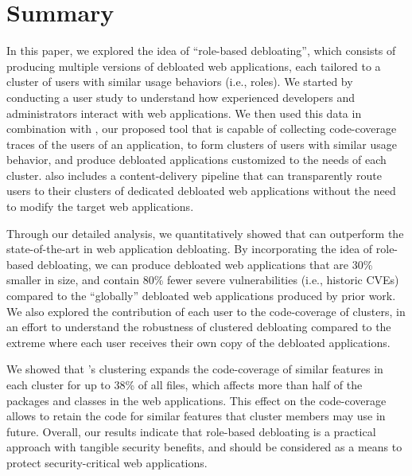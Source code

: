 \section{Summary}

In this paper, we explored the idea of ``role-based debloating'', which consists of producing multiple versions of debloated web applications, each tailored to a cluster of users with similar usage behaviors (i.e., roles). 
We started by conducting a user study to understand how experienced developers and administrators interact with web applications. 
We then used this data in combination with \dbltr{}, our proposed tool that is capable of collecting code-coverage traces of the users of an application, to form clusters of users with similar usage behavior, and produce debloated applications customized to the needs of each cluster. 
\dbltr{} also includes a content-delivery pipeline that can transparently route users to their clusters of dedicated debloated web applications without the need to modify the target web applications. 

Through our detailed analysis, we quantitatively showed that \dbltr{} can outperform the state-of-the-art in web application debloating. 
By incorporating the idea of role-based debloating, we can produce debloated web applications that are 30\% smaller in size, and contain 80\% fewer severe vulnerabilities (i.e., historic CVEs) compared to the ``globally'' debloated web applications produced by prior work. We also explored the contribution of each user to the code-coverage of clusters, in an effort to understand the robustness of clustered debloating compared to the extreme where each user receives their own copy of the debloated applications. 

We showed that \dbltr{}'s clustering expands the code-coverage of similar features in each cluster for up to 38\% of all files, which affects more than half of the packages and classes in the web applications. This effect on the code-coverage allows \dbltr{} to retain the code for similar features that cluster members may use in future. 
Overall, our results indicate that role-based debloating is a practical approach with tangible security benefits, and should be considered as a means to protect security-critical web applications. 

